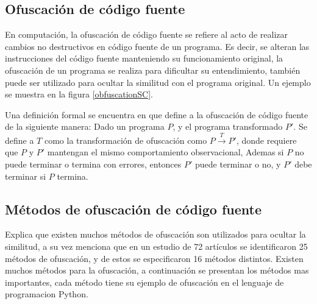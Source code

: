 \subsection{Ofuscación de código fuente}
En computación, la ofuscación de código fuente se refiere al acto de realizar cambios no destructivos en código fuente de un programa. Es decir, se alteran las instrucciones del código fuente manteniendo su funcionamiento original, la ofuscación de un programa se realiza para dificultar su entendimiento, también puede ser utilizado para ocultar la similitud con el programa original. Un ejemplo se muestra en la figura \ref{obfuscationSC}.



Una definición formal se encuentra en \cite{Collberg1997} que define a la ofuscación de código fuente de la siguiente manera: Dado un programa $P$, y el programa transformado ${P}'$. Se define a $T$ como la transformación de ofuscación como $P\overset{T}{\rightarrow}{P}'$, donde requiere que $P$ y ${P}'$ mantengan el mismo comportamiento observacional, Ademas si $P$ no puede terminar o termina con errores, entonces ${P}'$ puede terminar o no, y ${P}'$ debe terminar si ${P}$ termina.

\subsection{Métodos de ofuscación de código fuente}
\cite{Novak2019} Explica que existen muchos métodos de ofuscación son utilizados para ocultar la similitud, a su vez menciona que en un estudio de 72 artículos se identificaron 25 métodos de ofuscación, y de estos se especificaron 16 métodos distintos. Existen muchos métodos para la ofuscación, a continuación se presentan los métodos mas importantes, cada método tiene su ejemplo de ofuscación en el lenguaje de programacion Python.

